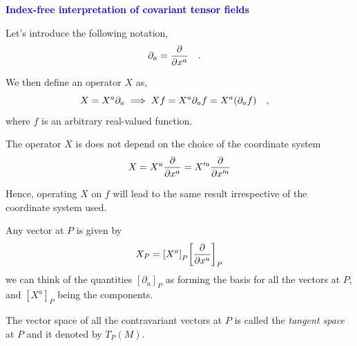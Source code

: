 \documentclass[landscape,aspectratio=169]{slides}
\begin{document}
\begin{slide}
	\textcolor{blue}{\textbf{Index-free interpretation of covariant tensor fields}}
	
	Let's introduce the following notation,
	\begin{equation}\label{key}
	\partial_a = \pdv{x^a} \qq{.}
	\end{equation}
	
	We then define an operator $ X $ as,
	\begin{equation}\label{key}
	X = X^a \partial_a \implies Xf = X^a \partial_a f = X^a (\partial_a f) \qq{,}
	\end{equation}
	where $ f $ is an arbitrary real-valued function. 
\end{slide}	

\begin{slide}
	The operator $ X $ is does not depend on the choice of the coordinate system $$ X = X^a \pdv{x^a} =X'^a \pdv{x'^a}  $$	
	
	Hence, operating $ X $ on $ f $ will lead to the same result irrespective of the coordinate system used.
	
	Any vector at $ P $ is given by
	\begin{equation}\label{key}
	 X_P = \qty[X^a]_P \qty[\pdv{x^a}]_P
	\end{equation} we can think of the quantities $ [\partial_a]_P $ as forming the basis for all the vectors at $ P $, and $ [X^a]_P $ being the components.
	
	The vector space of all the contravariant vectors at $ P $ is called the \textit{tangent space} at $ P $ and it denoted by $T_P(M)$.
\end{slide}
\end{document}
